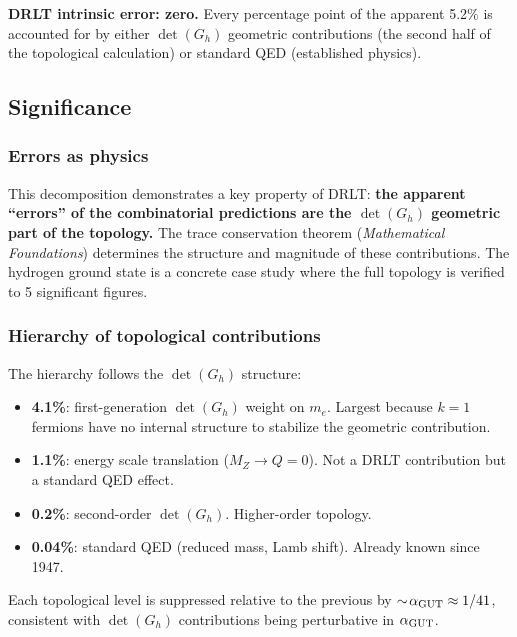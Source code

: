 \textbf{DRLT intrinsic error: zero.} Every percentage point of the apparent 5.2\% is accounted for by either $\det(G_h)$ geometric contributions (the second half of the topological calculation) or standard QED (established physics).

\subsection{Significance}

\subsubsection{Errors as physics}

This decomposition demonstrates a key property of DRLT: \textbf{the apparent ``errors'' of the combinatorial predictions are the $\det(G_h)$ geometric part of the topology.} The trace conservation theorem (\textit{Mathematical Foundations}) determines the structure and magnitude of these contributions. The hydrogen ground state is a concrete case study where the full topology is verified to 5 significant figures.

\subsubsection{Hierarchy of topological contributions}

The hierarchy follows the $\det(G_h)$ structure:
\begin{itemize}
\item \textbf{4.1\%}: first-generation $\det(G_h)$ weight on $m_e$. Largest because $k = 1$ fermions have no internal structure to stabilize the geometric contribution.
\item \textbf{1.1\%}: energy scale translation ($M_Z \to Q = 0$). Not a DRLT contribution but a standard QED effect.
\item \textbf{0.2\%}: second-order $\det(G_h)$. Higher-order topology.
\item \textbf{0.04\%}: standard QED (reduced mass, Lamb shift). Already known since 1947.
\end{itemize}

Each topological level is suppressed relative to the previous by $\sim\!\alpha_{\mathrm{GUT}} \approx 1/41$, consistent with $\det(G_h)$ contributions being perturbative in $\alpha_{\mathrm{GUT}}$.

